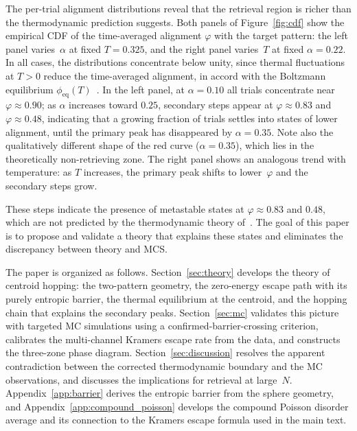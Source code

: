 \documentclass[11pt]{article}
\begin{document}
The per-trial alignment distributions reveal that the retrieval region is richer than the thermodynamic prediction suggests. Both panels of Figure~\ref{fig:cdf} show the empirical CDF of the time-averaged alignment $\varphi$ with the target pattern: the left panel varies~$\alpha$ at fixed $T = 0.325$, and the right panel varies~$T$ at fixed $\alpha = 0.22$. In all cases, the distributions concentrate below unity, since thermal fluctuations at $T > 0$ reduce the time-averaged alignment, in accord with the Boltzmann equilibrium $\phi_{\mathrm{eq}}(T)$~\citep{icml2026theory}. In the left panel, at $\alpha = 0.10$ all trials concentrate near $\varphi \approx 0.90$; as $\alpha$ increases toward $0.25$, secondary steps appear at $\varphi \approx 0.83$ and $\varphi \approx 0.48$, indicating that a growing fraction of trials settles into states of lower alignment, until the primary peak has disappeared by $\alpha = 0.35$. Note also the qualitatively different shape of the red curve ($\alpha = 0.35$), which lies in the theoretically non-retrieving zone. The right panel shows an analogous trend with temperature: as $T$ increases, the primary peak shifts to lower~$\varphi$ and the secondary steps grow.

These steps indicate the presence of metastable states at $\varphi \approx 0.83$ and $0.48$, which are not predicted by the thermodynamic theory of~\citet{icml2026theory}. The goal of this paper is to propose and validate a theory that explains these states and eliminates the discrepancy between theory and MCS.

The paper is organized as follows.  Section~\ref{sec:theory} develops the theory of centroid hopping: the two-pattern geometry, the zero-energy escape path with its purely entropic barrier, the thermal equilibrium at the centroid, and the hopping chain that explains the secondary peaks.  Section~\ref{sec:mc} validates this picture with targeted MC simulations using a confirmed-barrier-crossing criterion, calibrates the multi-channel Kramers escape rate from the data, and constructs the three-zone phase diagram.  Section~\ref{sec:discussion} resolves the apparent contradiction between the corrected thermodynamic boundary and the MC observations, and discusses the implications for retrieval at large~$N$.  Appendix~\ref{app:barrier} derives the entropic barrier from the sphere geometry, and Appendix~\ref{app:compound_poisson} develops the compound Poisson disorder average and its connection to the Kramers escape formula used in the main text.
\end{document}
